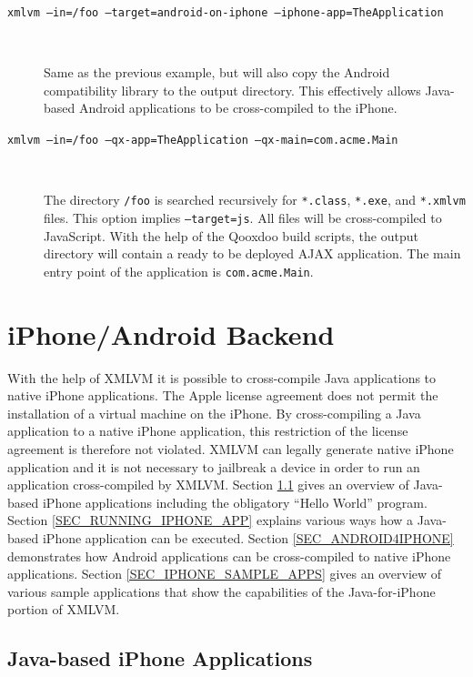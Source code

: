 \documentclass[11pt]{book}
\begin{document}
\begin{description}
\item[\texttt{xmlvm --in=/foo --target=android-on-iphone --iphone-app=TheApplication}] $ $

  Same as the previous example, but will also copy the Android
  compatibility library to the output directory. This effectively
  allows Java-based Android applications to be cross-compiled to the
  iPhone.

\item[\texttt{xmlvm --in=/foo --qx-app=TheApplication
    --qx-main=com.acme.Main}] $ $

  The directory \texttt{/foo} is searched recursively for
  \texttt{*.class}, \texttt{*.exe}, and \texttt{*.xmlvm} files. This
  option implies \texttt{--target=js}. All files will be
  cross-compiled to JavaScript. With the help of the Qooxdoo build
  scripts, the output directory will contain a ready to be deployed
  AJAX application. The main entry point of the application is
  \texttt{com.acme.Main}.

\end{description}



\chapter{iPhone/Android Backend}

With the help of XMLVM it is possible to cross-compile Java
applications to native iPhone applications. The Apple license
agreement does not permit the installation of a virtual machine on the
iPhone. By cross-compiling a Java application to a native iPhone
application, this restriction of the license agreement is therefore
not violated. XMLVM can legally generate native iPhone application and
it is not necessary to jailbreak a device in order to run an
application cross-compiled by XMLVM. Section \ref{SEC_IPHONE} gives an
overview of Java-based iPhone applications including the obligatory
``Hello World'' program. Section \ref{SEC_RUNNING_IPHONE_APP} explains
various ways how a Java-based iPhone application can be
executed. Section \ref{SEC_ANDROID4IPHONE} demonstrates how
Android applications can be cross-compiled to native iPhone
applications. Section \ref{SEC_IPHONE_SAMPLE_APPS} gives an overview
of various sample applications that show the capabilities of the
Java-for-iPhone portion of XMLVM.


\section{Java-based iPhone Applications}
\label{SEC_IPHONE}
\end{document}
